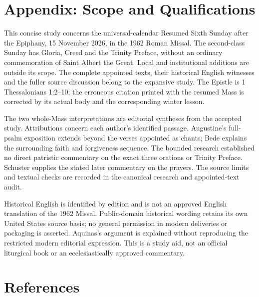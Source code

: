 \section{Appendix: Scope and Qualifications}

This concise study concerns the universal-calendar Resumed Sixth Sunday after the Epiphany, 15 November 2026, in the 1962 Roman Missal. The second-class Sunday has Gloria, Creed and the Trinity Preface, without an ordinary commemoration of Saint Albert the Great. Local and institutional additions are outside its scope. The complete appointed texts, their historical English witnesses and the fuller source discussion belong to the expansive study. The Epistle is 1 Thessalonians 1:2--10; the erroneous citation printed with the resumed Mass is corrected by its actual body and the corresponding winter lesson.

The two whole-Mass interpretations are editorial syntheses from the accepted study. Attributions concern each author's identified passage. Augustine's full-psalm exposition extends beyond the verses appointed as chants; Bede explains the surrounding faith and forgiveness sequence. The bounded research established no direct patristic commentary on the exact three orations or Trinity Preface. Schuster supplies the stated later commentary on the prayers. The source limits and textual checks are recorded in the canonical research and appointed-text audit.

Historical English is identified by edition and is not an approved English translation of the 1962 Missal. Public-domain historical wording retains its own United States source basis; no general permission in modern deliveries or packaging is asserted. Aquinas's argument is explained without reproducing the restricted modern editorial expression. This is a study aid, not an official liturgical book or an ecclesiastically approved commentary.

\section{References}

